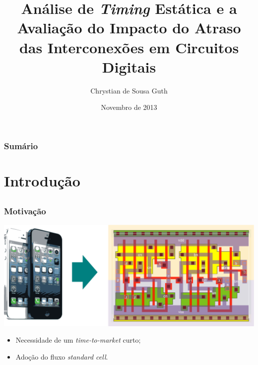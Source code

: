 \documentclass[10pt,a4paper]{beamer}
\title %
{Análise de \textit{Timing} Estática e a Avaliação do Impacto do Atraso das Interconexões em Circuitos Digitais}
\author %
{Chrystian de Sousa Guth}
\institute[UFSC] %
{
  Curso de Bacharelado em Ciências da Computação\\
  Universidade Federal de Santa Catarina

}
\date[nov12] %
{Novembro de 2013}
\begin{document}
	\frame{\titlepage}
	
	\begin{frame}
		\frametitle{Sumário}
		\tableofcontents[]
	\end{frame}

	\section{Introdução}
		
		\subsection*{}
			\begin{frame}
				\frametitle{Motivação}
				\includegraphics[width=\textwidth]{img/pmd_stdcell.pdf} 
				\begin{itemize}
					\item Necessidade de um \textit{time-to-market} curto;
					\item Adoção do fluxo \textit{standard cell}.
				\end{itemize}
			\end{frame}
		
\end{document}
